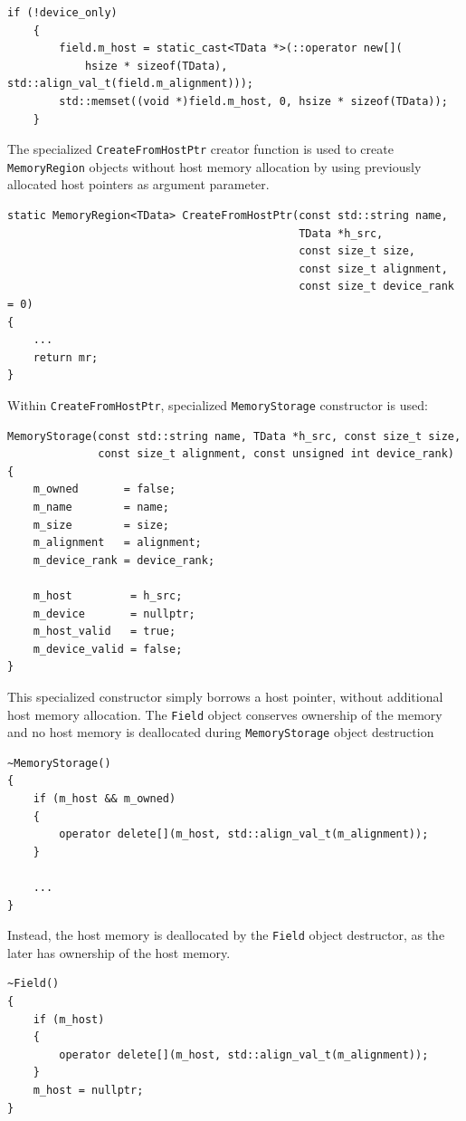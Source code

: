 \begin{lstlisting}[style=C++Style]
    if (!device_only)
    {
        field.m_host = static_cast<TData *>(::operator new[](
            hsize * sizeof(TData), std::align_val_t(field.m_alignment)));
        std::memset((void *)field.m_host, 0, hsize * sizeof(TData));
    }  
\end{lstlisting}

The specialized \lstinline[style=C++Style]!CreateFromHostPtr! creator function is used to create \lstinline[style=C++Style]!MemoryRegion! objects without host memory allocation by using previously allocated host pointers as argument parameter.
\begin{lstlisting}[style=C++Style]
static MemoryRegion<TData> CreateFromHostPtr(const std::string name,
                                             TData *h_src,
                                             const size_t size,
                                             const size_t alignment,
                                             const size_t device_rank = 0)
{
    ...
    return mr;
}
\end{lstlisting}

Within \lstinline[style=C++Style]!CreateFromHostPtr!, specialized \lstinline[style=C++Style]!MemoryStorage! constructor is used: 
\begin{lstlisting}[style=C++Style]
MemoryStorage(const std::string name, TData *h_src, const size_t size,
              const size_t alignment, const unsigned int device_rank)
{
    m_owned       = false;
    m_name        = name;
    m_size        = size;
    m_alignment   = alignment;
    m_device_rank = device_rank;

    m_host         = h_src;
    m_device       = nullptr;
    m_host_valid   = true;
    m_device_valid = false;
}
\end{lstlisting}

This specialized constructor simply borrows a host pointer, without additional host memory allocation. The \lstinline[style=C++Style]!Field! object conserves ownership of the memory and no host memory is deallocated during \lstinline[style=C++Style]!MemoryStorage! object destruction

\begin{lstlisting}[style=C++Style]
~MemoryStorage()
{
    if (m_host && m_owned)
    {
        operator delete[](m_host, std::align_val_t(m_alignment));
    }

    ...
}
\end{lstlisting}

Instead, the host memory is deallocated by the \lstinline[style=C++Style]!Field! object destructor, as the later has ownership of the host memory.
\begin{lstlisting}[style=C++Style]
~Field()
{
    if (m_host)
    {
        operator delete[](m_host, std::align_val_t(m_alignment));
    }
    m_host = nullptr;
}
\end{lstlisting}
